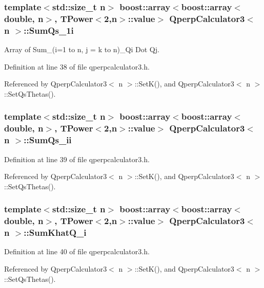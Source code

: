 \subsubsection{\setlength{\rightskip}{0pt plus 5cm}template$<$std::size\_\-t n$>$ boost::array$<$boost::array$<$double, n$>$, {\bf TPower}$<$2,n$>$::value$>$ {\bf QperpCalculator3}$<$ n $>$::{\bf SumQs\_\-1i}\hspace{0.3cm}{\tt  [private]}}\label{classQperpCalculator3_290cd6fd1b03b4518870a0dffbed6b47}


Array of Sum\_\-(i=1 to n, j = k to n)\_\-Qi Dot Qj. 



Definition at line 38 of file qperpcalculator3.h.

Referenced by QperpCalculator3$<$ n $>$::SetK(), and QperpCalculator3$<$ n $>$::SetQsThetas().
\subsubsection{\setlength{\rightskip}{0pt plus 5cm}template$<$std::size\_\-t n$>$ boost::array$<$boost::array$<$double, n$>$, {\bf TPower}$<$2,n$>$::value$>$ {\bf QperpCalculator3}$<$ n $>$::{\bf SumQs\_\-ii}\hspace{0.3cm}{\tt  [private]}}\label{classQperpCalculator3_03d47d0fb44f6320ab012840fbacd64a}




Definition at line 39 of file qperpcalculator3.h.

Referenced by QperpCalculator3$<$ n $>$::SetK(), and QperpCalculator3$<$ n $>$::SetQsThetas().
\subsubsection{\setlength{\rightskip}{0pt plus 5cm}template$<$std::size\_\-t n$>$ boost::array$<$boost::array$<$double, n$>$, {\bf TPower}$<$2,n$>$::value$>$ {\bf QperpCalculator3}$<$ n $>$::{\bf SumKhatQ\_\-i}\hspace{0.3cm}{\tt  [private]}}\label{classQperpCalculator3_986b83aeb3ebeff3a9deb94c0492151b}




Definition at line 40 of file qperpcalculator3.h.

Referenced by QperpCalculator3$<$ n $>$::SetK(), and QperpCalculator3$<$ n $>$::SetQsThetas().
